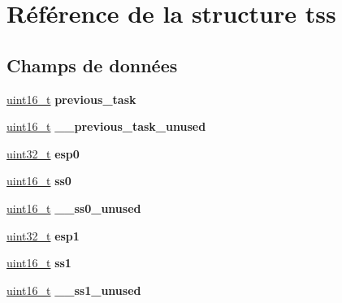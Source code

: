 \hypertarget{structtss}{\section{Référence de la structure tss}
\label{structtss}
}
\subsection*{Champs de données}
\begin{DoxyCompactItemize}
\item 
\hypertarget{structtss_ad53ac7d2e96d874b937cd8ba2ec99b68}{\hyperlink{types_8h_adf4d876453337156dde61095e1f20223}{uint16\-\_\-t} {\bfseries previous\-\_\-task}}\label{structtss_ad53ac7d2e96d874b937cd8ba2ec99b68}

\item 
\hypertarget{structtss_aa9c707a0e579d5c4aa5cdc6a74dc52f0}{\hyperlink{types_8h_adf4d876453337156dde61095e1f20223}{uint16\-\_\-t} {\bfseries \-\_\-\-\_\-previous\-\_\-task\-\_\-unused}}\label{structtss_aa9c707a0e579d5c4aa5cdc6a74dc52f0}

\item 
\hypertarget{structtss_a7e43a5ebd87f7dc5b342942daf46b6f1}{\hyperlink{types_8h_a33594304e786b158f3fb30289278f5af}{uint32\-\_\-t} {\bfseries esp0}}\label{structtss_a7e43a5ebd87f7dc5b342942daf46b6f1}

\item 
\hypertarget{structtss_a21766cd40c3c8f0036091d76956edc6c}{\hyperlink{types_8h_adf4d876453337156dde61095e1f20223}{uint16\-\_\-t} {\bfseries ss0}}\label{structtss_a21766cd40c3c8f0036091d76956edc6c}

\item 
\hypertarget{structtss_ae0b947bcd701d61513f54ae0fe5d8e67}{\hyperlink{types_8h_adf4d876453337156dde61095e1f20223}{uint16\-\_\-t} {\bfseries \-\_\-\-\_\-ss0\-\_\-unused}}\label{structtss_ae0b947bcd701d61513f54ae0fe5d8e67}

\item 
\hypertarget{structtss_ab2b4ce638811e1a254005e069886f8b3}{\hyperlink{types_8h_a33594304e786b158f3fb30289278f5af}{uint32\-\_\-t} {\bfseries esp1}}\label{structtss_ab2b4ce638811e1a254005e069886f8b3}

\item 
\hypertarget{structtss_aa527f4b4f275061d8750f527c7ab6fcf}{\hyperlink{types_8h_adf4d876453337156dde61095e1f20223}{uint16\-\_\-t} {\bfseries ss1}}\label{structtss_aa527f4b4f275061d8750f527c7ab6fcf}

\item 
\hypertarget{structtss_a1f7d520f366f7e044b4b0d0c66a8ced8}{\hyperlink{types_8h_adf4d876453337156dde61095e1f20223}{uint16\-\_\-t} {\bfseries \-\_\-\-\_\-ss1\-\_\-unused}}\label{structtss_a1f7d520f366f7e044b4b0d0c66a8ced8}


\end{DoxyCompactItemize}
